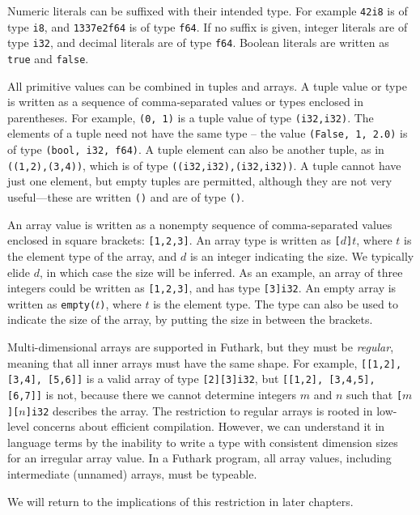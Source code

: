 \documentclass[11pt]{book}
\begin{document}
Numeric literals can be suffixed with their intended type.  For
example \texttt{42i8} is of type \texttt{i8}, and \texttt{1337e2f64}
is of type \texttt{f64}.  If no suffix is given, integer literals are
of type \texttt{i32}, and decimal literals are of type \texttt{f64}.
Boolean literals are written as \texttt{true} and \texttt{false}.

All primitive values can be combined in tuples and arrays.  A tuple
value or type is written as a sequence of comma-separated values or
types enclosed in parentheses.  For example, \texttt{(0, 1)} is a
tuple value of type \texttt{(i32,i32)}.  The elements of a tuple need
not have the same type -- the value \texttt{(False, 1, 2.0)} is of
type \texttt{(bool, i32, f64)}.  A tuple element can also be another
tuple, as in \texttt{((1,2),(3,4))}, which is of type
\texttt{((i32,i32),(i32,i32))}.  A tuple cannot have just one element,
but empty tuples are permitted, although they are not very useful---these are
written \texttt{()} and are of type \texttt{()}.

An array value is written as a nonempty sequence of comma-separated
values enclosed in square brackets: \texttt{[1,2,3]}.  An array type
is written as \texttt{[$d$]$t$}, where \texttt{$t$} is the element
type of the array, and $d$ is an integer indicating the size.  We
typically elide $d$, in which case the size will be inferred.  As an
example, an array of three integers could be written as
\texttt{[1,2,3]}, and has type \texttt{[3]i32}.  An empty array is
written as \texttt{empty($t$)}, where \texttt{$t$} is the element
type.  The type can also be used to indicate the size of the array, by
putting the size in between the brackets.

Multi-dimensional arrays are supported in Futhark, but they must be
\textit{regular}, meaning that all inner arrays must have the same
shape.  For example, \texttt{[[1,2], [3,4], [5,6]]} is a valid array
of type \texttt{[2][3]i32}, but \texttt{[[1,2], [3,4,5], [6,7]]} is
not, because there we cannot determine integers $m$ and $n$ such that
\texttt{[$m$][$n$]i32} describes the array.  The restriction to
regular arrays is rooted in low-level concerns about efficient
compilation.  However, we can understand it in language terms by the
inability to write a type with consistent dimension sizes for an
irregular array value.  In a Futhark program, all array values,
including intermediate (unnamed) arrays, must be typeable.

We will return to the implications of this restriction in later
chapters.
\end{document}
